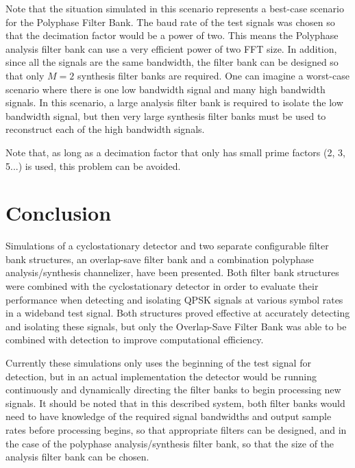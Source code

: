 \documentclass[12pt]{article}
\begin{document}
Note that the situation simulated in this scenario represents a best-case 
scenario for the Polyphase Filter Bank. The baud rate of the test signals 
was chosen so that the decimation factor would be a power of two. This
means the Polyphase analysis filter bank can use a very efficient power of two 
FFT size. In addition, since all the signals are the same bandwidth, the filter
bank can be designed so that only $M=2$ synthesis filter banks are required.
One can imagine a worst-case scenario where there is one low bandwidth signal
and many high bandwidth signals. In this scenario, a large analysis filter bank 
is required to isolate the low bandwidth signal, but then very large synthesis 
filter banks must be used to reconstruct each of the high bandwidth signals.

Note that, as long as a decimation factor that only has small prime factors
(2, 3, 5...) is used, this problem can be avoided. 



\section{Conclusion}
\label{sec:conclusion}
Simulations of a cyclostationary detector and two separate configurable filter
bank structures, an overlap-save filter bank and a combination polyphase
analysis/synthesis channelizer, have been presented. Both filter bank
structures were combined with the cyclostationary detector in order to evaluate
their performance when detecting and isolating QPSK signals at various symbol
rates in a wideband test signal. Both structures proved effective at accurately
detecting and isolating these signals, but only the Overlap-Save Filter Bank
was able to be combined with detection to improve computational efficiency.

Currently these simulations only uses the beginning of the test signal for
detection, but in an actual implementation the detector would be running
continuously and dynamically directing the filter banks to begin processing new
signals. It should be noted that in this described system, both filter banks would
need to have knowledge of the required signal bandwidths and output sample
rates before processing begins, so that appropriate filters can be designed, and
in the case of the polyphase analysis/synthesis filter bank, so that the size
of the analysis filter bank can be chosen.
\end{document}
